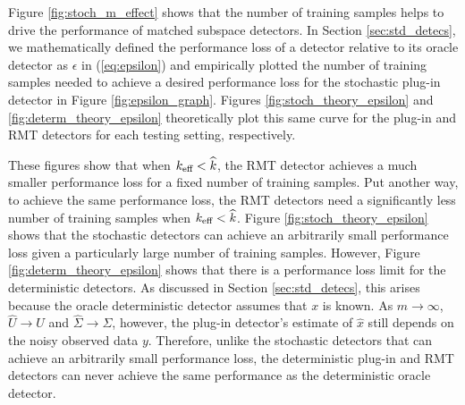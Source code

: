 Figure \ref{fig:stoch_m_effect} shows that the number of training samples helps to drive the performance of matched subspace detectors. In Section \ref{sec:std_detecs}, we mathematically defined the performance loss of a detector relative to its oracle detector as $\epsilon$ in (\ref{eq:epsilon}) and empirically plotted the number of training samples needed to achieve a desired performance loss for the stochastic plug-in detector in Figure \ref{fig:epsilon_graph}. Figures \ref{fig:stoch_theory_epsilon} and \ref{fig:determ_theory_epsilon} theoretically plot this same curve for the plug-in and RMT detectors for each testing setting, respectively.

These figures show that when $k_\text{eff}<\widehat{k}$, the RMT detector achieves a much smaller performance loss for a fixed number of training samples. Put another way, to achieve the same performance loss, the RMT detectors need a significantly less number of training samples when $k_\text{eff}<\widehat{k}$. Figure \ref{fig:stoch_theory_epsilon} shows that the stochastic detectors can achieve an arbitrarily small performance loss given a particularly large number of training samples. However, Figure \ref{fig:determ_theory_epsilon} shows that there is a performance loss limit for the deterministic detectors. As discussed in Section \ref{sec:std_detecs}, this arises because the oracle deterministic detector assumes that $x$ is known. As $m\to\infty$, $\widehat{U}\to U$ and $\widehat{\Sigma}\to\Sigma$, however, the plug-in detector's estimate of $\widehat{x}$ still depends on the noisy observed data $y$. Therefore, unlike the stochastic detectors that can achieve an arbitrarily small performance loss, the deterministic plug-in and RMT detectors can never achieve the same performance as the deterministic oracle detector.

